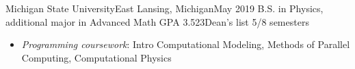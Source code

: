 \begin{school}{Michigan State University}{East Lansing, Michigan}{May 2019}%
              {B.S. in Physics, additional major in Advanced Math}
    GPA 3.523\qquad Dean's list 5/8 semesters
    \begin{itemize}
        \item \emph{Programming coursework}:
            Intro Computational Modeling,
            Methods of Parallel Computing,
            Computational Physics
    \end{itemize}
\end{school}
